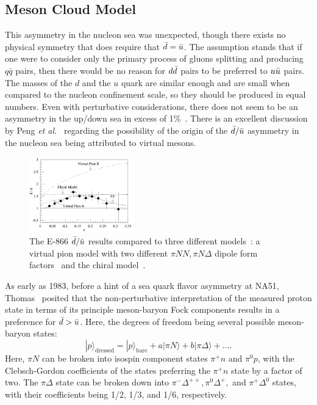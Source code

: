 \subsection{Meson Cloud Model}

This asymmetry in the nucleon sea was unexpected, though there exists no physical symmetry that does require that $\bar{d}=\bar{u}$. The assumption stands that if one were to consider only the primary process of gluons splitting and producing $q\bar{q}$ pairs, then there would be no reason for $d\bar{d}$ pairs to be preferred to $u\bar{u}$ pairs. The masses of the $d$ and the $u$ quark are similar enough and are small when compared to the nucleon confinement scale, so they should be produced in equal numbers. Even with perturbative considerations, there does not seem to be an asymmetry in the up/down sea in excess of 1\%~\cite{Ross:1978xk}. There is an excellent discussion by Peng \emph{et al.}~\cite{Peng:1998pa} regarding the possibility of the origin of the $\bar{d}/\bar{u}$ asymmetry in the nucleon sea being attributed to virtual mesons.

\begin{figure}
	\centering
	\includegraphics[width=0.4\textwidth]{figures/background/meson-cloud-dbar-ubar.png}
	\caption{The E-866 $\bar{d}/\bar{u}$ results compared to three different models~\cite{Peng:1998pa}: a virtual pion model with two different $\pi NN , \pi N\Delta$ dipole form factors~\cite{Kumano:1990mm, Koepf:1995yh} and the chiral model~\cite{Szczurek:1996tp}.}
	\label{fig:pion-model-dbar-ubar}
\end{figure}
As early as 1983, before a hint of a sea quark flavor asymmetry at NA51, Thomas~\cite{Thomas:1983fh} posited that the non-perturbative interpretation of the measured proton state in terms of its principle meson-baryon Fock components results in a preference for $\bar{d}>\bar{u}$. Here, the degrees of freedom being several possible meson-baryon states:
\begin{equation}
|p\rangle_{\text{dressed}} = |p\rangle_{\text{bare}} + a|\pi N\rangle + b|\pi \Delta\rangle + ... .
\end{equation} 
Here, $\pi N$ can be broken into isospin component states $\pi^+ n$ and $\pi^0 p$, with the Clebsch-Gordon coefficients of the states preferring the $\pi^+ n$ state by a factor of two. The $\pi \Delta$ state can be broken down into $\pi^- \Delta^{++}, \pi^0 \Delta^+,$ and $\pi^+ \Delta^0$ states, with their coefficients being 1/2, 1/3, and 1/6, respectively.

